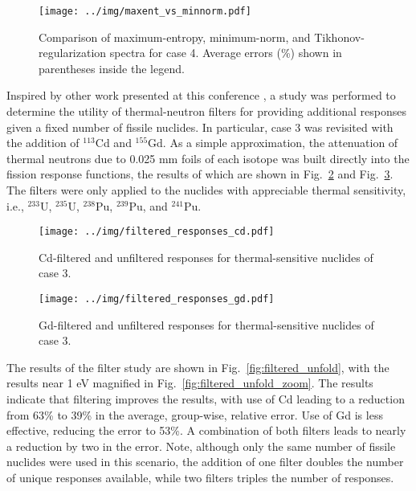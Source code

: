 \documentclass[journal]{IEEEtran}
\newcommand{\FIG}[1]{Fig.~\ref{#1}}               %
\begin{document}
\begin{figure}[h!tb]
  \centering
  \texttt{[image: ../img/maxent\_vs\_minnorm.pdf]}
  \caption{Comparison of maximum-entropy, minimum-norm, and Tikhonov-regularization spectra for case 4.   Average  errors (\%) shown in parentheses inside the legend.}
  \label{fig:maxent_vs_minnorm}
\end{figure}

Inspired by other work presented at this conference \cite{kaiba2017cso}, a study was performed to determine the utility of thermal-neutron filters for providing additional responses given a fixed number of fissile nuclides.  In particular, case 3 was revisited with the addition of ${}^{113}$Cd and ${}^{155}$Gd.  As a simple approximation, the attenuation of thermal neutrons due to 0.025 mm foils of each isotope was built directly into the fission response functions, the results of which are shown in \FIG{fig:filtered_responses_cd} and \FIG{fig:filtered_responses_gd}.  The filters were only applied to the nuclides with appreciable thermal sensitivity, i.e., ${}^{233}$U, ${}^{235}$U, ${}^{238}$Pu, ${}^{239}$Pu, and ${}^{241}$Pu.

\begin{figure}[h!tb]
  \centering
  \texttt{[image: ../img/filtered\_responses\_cd.pdf]}
  \caption{Cd-filtered and unfiltered responses for thermal-sensitive nuclides of case 3.}
  \label{fig:filtered_responses_cd}
\end{figure}

\begin{figure}[h!tb]
  \centering
  \texttt{[image: ../img/filtered\_responses\_gd.pdf]}
  \caption{Gd-filtered and unfiltered responses for thermal-sensitive nuclides of case 3.}
  \label{fig:filtered_responses_gd}
\end{figure}

The results of the filter study are shown in \FIG{fig:filtered_unfold}, with the results near 1 eV magnified in \FIG{fig:filtered_unfold_zoom}.  The results indicate that filtering improves the results, with use of Cd leading to a reduction from 63\% to 39\% in the average, group-wise, relative error.  Use of Gd is less effective, reducing the error to 53\%.  A combination of both filters leads to nearly a reduction by two in the error.  Note, although only the same number of fissile nuclides were used in this scenario, the addition of one filter doubles the number of unique responses available, while two filters triples the number of responses. 
\end{document}
